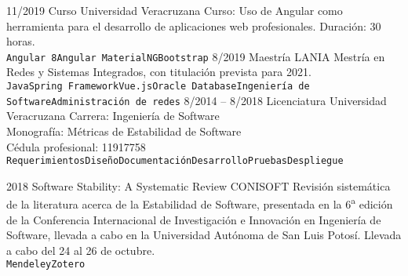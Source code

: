 \documentclass[9pt]{developercv} %
\begin{document}

\begin{entrylist}
	\entry
		{11/2019}
		{Curso}
		{Universidad Veracruzana}
        {Curso: Uso de Angular como herramienta para el desarrollo de aplicaciones web profesionales. Duración: 30 horas.\\
        \texttt{Angular 8}\slashsep\texttt{Angular Material}\slashsep\texttt{NGBootstrap}}
	\entry
		{8/2019}
		{Maestría}
		{LANIA}
        {Mestría en Redes y Sistemas Integrados, con titulación prevista para 2021.\\
        \texttt{Java}\slashsep\texttt{Spring Framework}\slashsep\texttt{Vue.js}\slashsep\texttt{Oracle Database}\slashsep\texttt{Ingeniería de Software}\slashsep\texttt{Administración de redes}}
	\entry
		{8/2014 -- 8/2018}
		{Licenciatura}
		{Universidad Veracruzana}
        {Carrera: Ingeniería de Software\\
        Monografía: Métricas de Estabilidad de Software\\
        Cédula profesional: 11917758\\
        \texttt{Requerimientos}\slashsep\texttt{Diseño}\slashsep\texttt{Documentación}\slashsep\texttt{Desarrollo}\slashsep\texttt{Pruebas}\slashsep\texttt{Despliegue}}
\end{entrylist}



\begin{entrylist}
	\entry
		{2018}
		{Software Stability: A Systematic Review}
		{CONISOFT}
        {Revisión sistemática de la literatura acerca de la Estabilidad de Software, presentada en la 6\textsuperscript{a} edición de la Conferencia Internacional de Investigación e Innovación en Ingeniería de Software, llevada a cabo en la Universidad Autónoma de San Luis Potosí. Llevada a cabo del 24 al 26 de octubre.\\
        \texttt{Mendeley}\slashsep\texttt{Zotero}}
\end{entrylist}



\end{document}
